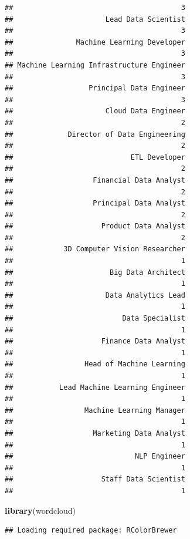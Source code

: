 \documentclass[
]{article}
\newenvironment{Shaded}{\begin{snugshade}}{\end{snugshade}}
\newcommand{\FunctionTok}[1]{\textcolor[rgb]{0.13,0.29,0.53}{\textbf{#1}}}
\newcommand{\NormalTok}[1]{#1}
\begin{document}
\begin{verbatim}
##                                        3 
##                      Lead Data Scientist 
##                                        3 
##               Machine Learning Developer 
##                                        3 
## Machine Learning Infrastructure Engineer 
##                                        3 
##                  Principal Data Engineer 
##                                        3 
##                      Cloud Data Engineer 
##                                        2 
##             Director of Data Engineering 
##                                        2 
##                            ETL Developer 
##                                        2 
##                   Financial Data Analyst 
##                                        2 
##                   Principal Data Analyst 
##                                        2 
##                     Product Data Analyst 
##                                        2 
##            3D Computer Vision Researcher 
##                                        1 
##                       Big Data Architect 
##                                        1 
##                      Data Analytics Lead 
##                                        1 
##                          Data Specialist 
##                                        1 
##                     Finance Data Analyst 
##                                        1 
##                 Head of Machine Learning 
##                                        1 
##           Lead Machine Learning Engineer 
##                                        1 
##                 Machine Learning Manager 
##                                        1 
##                   Marketing Data Analyst 
##                                        1 
##                             NLP Engineer 
##                                        1 
##                     Staff Data Scientist 
##                                        1
\end{verbatim}

\begin{Shaded}
\begin{Highlighting}[]
\FunctionTok{library}\NormalTok{(wordcloud)}
\end{Highlighting}
\end{Shaded}

\begin{verbatim}
## Loading required package: RColorBrewer
\end{verbatim}
\end{document}
